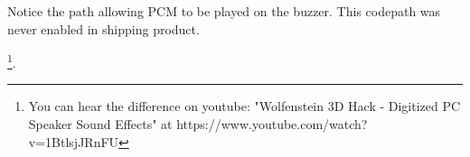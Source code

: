 \par 
\begin{minipage}{\textwidth}

\end{minipage}
\par
Notice the  path allowing PCM to be played on the buzzer. This codepath was never enabled in shipping product.\\
\par
\footnote{You can hear the difference on youtube: "Wolfenstein 3D Hack - Digitized PC Speaker Sound Effects" at https://www.youtube.com/watch?v=1BtlsjJRnFU}.\\
\par
{}














